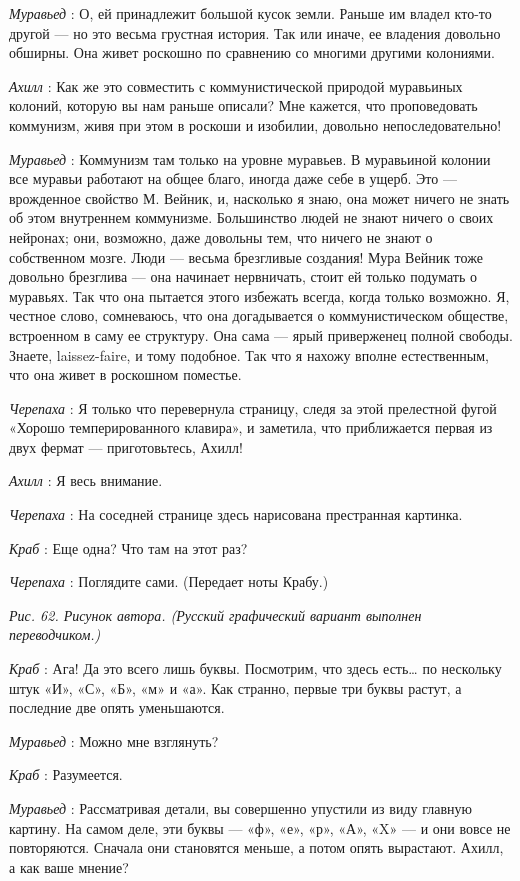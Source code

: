 \documentclass[../main.tex]{subfiles}
\begin{document}
\begin{dialogue}
\emph{Муравьед} : О, ей принадлежит большой кусок земли. Раньше им владел кто-то другой --- но это весьма грустная история. Так или иначе, ее владения довольно обширны. Она живет роскошно по сравнению со многими другими колониями.

\emph{Ахилл} : Как же это совместить с коммунистической природой муравьиных колоний, которую вы нам раньше описали? Мне кажется, что проповедовать коммунизм, живя при этом в роскоши и изобилии, довольно непоследовательно!

\emph{Муравьед} : Коммунизм там только на уровне муравьев. В муравьиной колонии все муравьи работают на общее благо, иногда даже себе в ущерб. Это --- врожденное свойство М. Вейник, и, насколько я знаю, она может ничего не знать об этом внутреннем коммунизме. Большинство людей не знают ничего о своих нейронах; они, возможно, даже довольны тем, что ничего не знают о собственном мозге. Люди --- весьма брезгливые создания! Мура Вейник тоже довольно брезглива --- она начинает нервничать, стоит ей только подумать о муравьях. Так что она пытается этого избежать всегда, когда только возможно. Я, честное слово, сомневаюсь, что она догадывается о коммунистическом обществе, встроенном в саму ее структуру. Она сама --- ярый приверженец полной свободы. Знаете, laissez-faire, и тому подобное. Так что я нахожу вполне естественным, что она живет в роскошном поместье.

\emph{Черепаха} : Я только что перевернула страницу, следя за этой прелестной фугой «Хорошо темперированного клавира», и заметила, что приближается первая из двух фермат --- приготовьтесь, Ахилл!

\emph{Ахилл} : Я весь внимание.

\emph{Черепаха} : На соседней странице здесь нарисована престранная картинка.

\emph{Краб} : Еще одна? Что там на этот раз?

\emph{Черепаха} : Поглядите сами. (Передает ноты Крабу.)

\emph{Рис. 62. Рисунок автора. (Русский графический вариант выполнен переводчиком.)}

\emph{Краб} : Ага! Да это всего лишь буквы. Посмотрим, что здесь есть\ldots{} по нескольку штук «И», «С», «Б», «м» и «а». Как странно, первые три буквы растут, а последние две опять уменьшаются.

\emph{Муравьед} : Можно мне взглянуть?

\emph{Краб} : Разумеется.

\emph{Муравьед} : Рассматривая детали, вы совершенно упустили из виду главную картину. На самом деле, эти буквы --- «ф», «е», «р», «А», «X» --- и они вовсе не повторяются. Сначала они становятся меньше, а потом опять вырастают. Ахилл, а как ваше мнение?


\end{dialogue}
\end{document}
